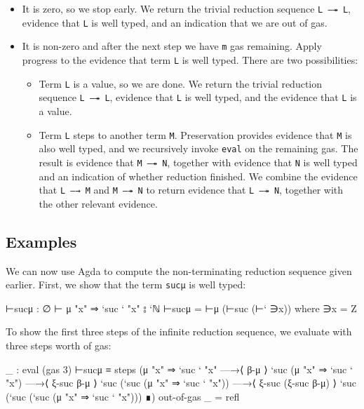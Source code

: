 \begin{itemize}
\item
  It is zero, so we stop early. We return the trivial reduction sequence
  \texttt{L\ —↠\ L}, evidence that \texttt{L} is well typed, and an
  indication that we are out of gas.
\item
  It is non-zero and after the next step we have \texttt{m} gas
  remaining. Apply progress to the evidence that term \texttt{L} is well
  typed. There are two possibilities:

  \begin{itemize}
  \item
    Term \texttt{L} is a value, so we are done. We return the trivial
    reduction sequence \texttt{L\ —↠\ L}, evidence that \texttt{L} is
    well typed, and the evidence that \texttt{L} is a value.
  \item
    Term \texttt{L} steps to another term \texttt{M}. Preservation
    provides evidence that \texttt{M} is also well typed, and we
    recursively invoke \texttt{eval} on the remaining gas. The result is
    evidence that \texttt{M\ —↠\ N}, together with evidence that
    \texttt{N} is well typed and an indication of whether reduction
    finished. We combine the evidence that \texttt{L\ —→\ M} and
    \texttt{M\ —↠\ N} to return evidence that \texttt{L\ —↠\ N},
    together with the other relevant evidence.
  \end{itemize}
\end{itemize}

\hypertarget{examples}{%
\subsection{Examples}\label{examples}}

We can now use Agda to compute the non-terminating reduction sequence
given earlier. First, we show that the term \texttt{sucμ} is well typed:

\begin{fence}
\begin{code}
⊢sucμ : ∅ ⊢ μ "x" ⇒ `suc ` "x" ⦂ `ℕ
⊢sucμ = ⊢μ (⊢suc (⊢` ∋x))
  where
  ∋x = Z
\end{code}
\end{fence}

To show the first three steps of the infinite reduction sequence, we
evaluate with three steps worth of gas:

\begin{fence}
\begin{code}
_ : eval (gas 3) ⊢sucμ ≡
  steps
   (μ "x" ⇒ `suc ` "x"
   —→⟨ β-μ ⟩
    `suc (μ "x" ⇒ `suc ` "x")
   —→⟨ ξ-suc β-μ ⟩
    `suc (`suc (μ "x" ⇒ `suc ` "x"))
   —→⟨ ξ-suc (ξ-suc β-μ) ⟩
    `suc (`suc (`suc (μ "x" ⇒ `suc ` "x")))
   ∎)
   out-of-gas
_ = refl
\end{code}
\end{fence}

